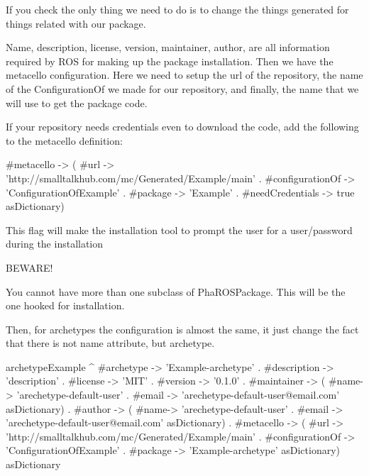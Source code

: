 \documentclass[a4paper,10pt,twoside]{book}
\begin{document}
						If you check the only thing we need to do is to change the things generated for things related with our package. 
						
						Name, description, license, version, maintainer, author, are all information required by ROS for making up the package installation.
						Then we have the metacello configuration.  Here we need to setup the url of the repository, the name of the ConfigurationOf we made for our repository, and finally, the name that we will use to get the package code. 
						
						If your repository needs credentials even to download the code, add the following to the metacello definition: 
						
						
		\begin{code}
		#metacello -> ({ 
				#url -> 'http://smalltalkhub.com/mc/Generated/Example/main' . 
				#configurationOf -> 'ConfigurationOfExample' . 
				#package -> 'Example'  . 
				#needCredentials -> true
			} asDictionary)
		\end{code}
						
						This flag will make the installation tool to prompt the user for a user/password during the installation
						
						BEWARE! 
						
						You cannot have more than one subclass of PhaROSPackage. This will be the one hooked for installation. 
						
						
						
						
						
						
						
						Then, for archetypes the configuration is almost the same, it just change the fact that there is not name attribute, but archetype. 
						
						
					\begin{code}
archetypeExample
	^ { 
			#archetype -> 'Example-archetype' .
			#description -> 'description' . 
			#license ->  'MIT'  .
			#version -> '0.1.0' .
			#maintainer -> ({ 
				#name-> 'arechetype-default-user' . 
				#email -> 'arechetype-default-user@email.com' 
			}  asDictionary) .
			#author -> ({  
				#name-> 'arechetype-default-user' . 
				#email -> 'arechetype-default-user@email.com'  
			} asDictionary) .
			#metacello -> ({ 
				#url -> 'http://smalltalkhub.com/mc/Generated/Example/main' . 
				#configurationOf -> 'ConfigurationOfExample' . 
				#package -> 'Example-archetype'  
			} asDictionary)
		 } asDictionary 
	
					
					\end{code}
					
\end{document}

